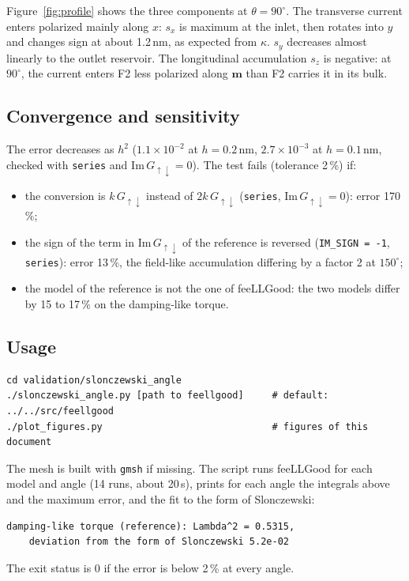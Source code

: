 \documentclass[11pt,a4paper]{article}
\newcommand{\vm}{\bm{m}}
\begin{document}
Figure~\ref{fig:profile} shows the three components at $\theta =
90^\circ$. The transverse current enters polarized mainly along $x$:
$s_x$ is maximum at the inlet, then rotates into $y$ and changes sign at
about 1.2\,nm, as expected from $\kappa$. $s_y$ decreases almost linearly
to the outlet reservoir. The longitudinal accumulation $s_z$ is negative:
at $90^\circ$, the current enters F2 less polarized along $\vm$ than F2
carries it in its bulk.

\subsection{Convergence and sensitivity}

The error decreases as $h^2$ ($1.1\times10^{-2}$ at $h = 0.2$\,nm,
$2.7\times10^{-3}$ at $h = 0.1$\,nm, checked with \texttt{series} and
$\mathrm{Im}\,G_{\uparrow\downarrow} = 0$). The test fails (tolerance
2\,\%) if:
\begin{itemize}
  \item the conversion is $k\,G_{\uparrow\downarrow}$ instead of
    $2k\,G_{\uparrow\downarrow}$ (\texttt{series},
    $\mathrm{Im}\,G_{\uparrow\downarrow} = 0$): error 170\,\%;
  \item the sign of the term in $\mathrm{Im}\,G_{\uparrow\downarrow}$ of the
    reference is reversed (\texttt{IM\_SIGN = -1}, \texttt{series}): error
    13\,\%, the field-like accumulation differing by a factor 2 at
    $150^\circ$;
  \item the model of the reference is not the one of feeLLGood: the two
    models differ by 15 to 17\,\% on the damping-like torque.
\end{itemize}

\subsection{Usage}

\begin{verbatim}
cd validation/slonczewski_angle
./slonczewski_angle.py [path to feellgood]     # default: ../../src/feellgood
./plot_figures.py                              # figures of this document
\end{verbatim}
The mesh is built with \texttt{gmsh} if missing. The script runs
feeLLGood for each model and angle (14 runs, about 20\,s), prints for each
angle the integrals above and the maximum error, and the fit to the form
of Slonczewski:
\begin{verbatim}
damping-like torque (reference): Lambda^2 = 0.5315,
    deviation from the form of Slonczewski 5.2e-02
\end{verbatim}
The exit status is 0 if the error is below 2\,\% at every angle.
\end{document}
